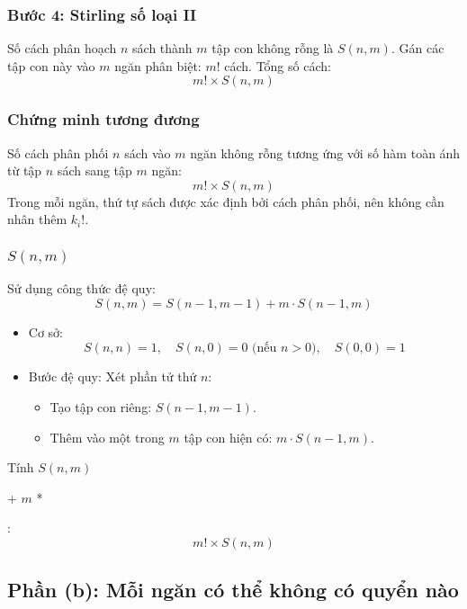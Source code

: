 \documentclass[a4paper,12pt]{article}
\theoremstyle{plain}
\theoremstyle{definition}
\begin{document}
\subsubsection*{Bước 4: Stirling số loại II}
Số cách phân hoạch \( n \) sách thành \( m \) tập con không rỗng là \( S(n,m) \). Gán các tập con này vào \( m \) ngăn phân biệt: \( m! \) cách. Tổng số cách:
\[
m! \times S(n,m)
\]

\subsubsection*{Chứng minh tương đương}
Số cách phân phối \( n \) sách vào \( m \) ngăn không rỗng tương ứng với số hàm toàn ánh từ tập \( n \) sách sang tập \( m \) ngăn:
\[
m! \times S(n,m)
\]
Trong mỗi ngăn, thứ tự sách được xác định bởi cách phân phối, nên không cần nhân thêm \( k_i! \).

\subsubsection*{\( S(n,m) \)}
Sử dụng công thức đệ quy:
\[
S(n,m) = S(n-1,m-1) + m \cdot S(n-1,m)
\]
\begin{itemize}
    \item Cơ sở:
    \[
    S(n,n) = 1, \quad S(n,0) = 0 \text{ (nếu } n > 0\text{)}, \quad S(0,0) = 1
    \]
    \item Bước đệ quy: Xét phần tử thứ \( n \):
    \begin{itemize}
        \item Tạo tập con riêng: \( S(n-1,m-1) \).
        \item Thêm vào một trong \( m \) tập con hiện có: \( m \cdot S(n-1,m) \).
    \end{itemize}
\end{itemize}

\begin{algorithm}
\caption{Tính \( S(n,m) \)}
\begin{algorithmic}
     
     
    \EndIf
    \State \Return {} + $m$ * 
\EndFunction
\end{algorithmic}
\end{algorithm}

:
\[
\boxed{m! \times S(n,m)}
\]

\subsection*{Phần (b): Mỗi ngăn có thể không có quyển nào}
\end{document}
